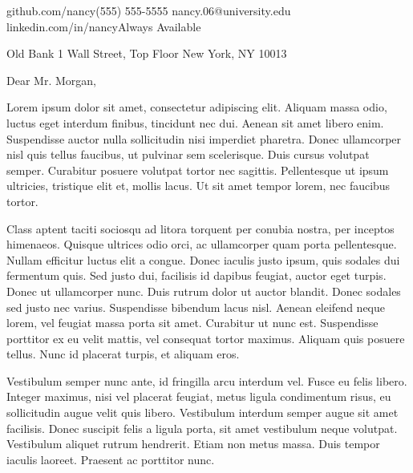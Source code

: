 \documentclass{practical-cover-letter}
\begin{document}
\namehead

\address{nancy.com}{github.com/nancy}{(555) 555-5555}{ nancy.06@university.edu }{linkedin.com/in/nancy}{Always Available}
%
%
\hfill

\begin{changemargin}{.7in}{.7in} 
\employerdate{\today}

\begin{changemargin}{.3in}{.3in} 
{Old Bank}
{1 Wall Street, Top Floor}
{New York, NY 10013}
\end{changemargin}


Dear Mr. Morgan,

Lorem ipsum dolor sit amet, consectetur adipiscing elit. Aliquam massa odio, luctus eget interdum finibus, tincidunt nec dui. Aenean sit amet libero enim. Suspendisse auctor nulla sollicitudin nisi imperdiet pharetra. Donec ullamcorper nisl quis tellus faucibus, ut pulvinar sem scelerisque. Duis cursus volutpat semper. Curabitur posuere volutpat tortor nec sagittis. Pellentesque ut ipsum ultricies, tristique elit et, mollis lacus. Ut sit amet tempor lorem, nec faucibus tortor.

Class aptent taciti sociosqu ad litora torquent per conubia nostra, per inceptos himenaeos. Quisque ultrices odio orci, ac ullamcorper quam porta pellentesque. Nullam efficitur luctus elit a congue. Donec iaculis justo ipsum, quis sodales dui fermentum quis. Sed justo dui, facilisis id dapibus feugiat, auctor eget turpis. Donec ut ullamcorper nunc. Duis rutrum dolor ut auctor blandit. Donec sodales sed justo nec varius. Suspendisse bibendum lacus nisl. Aenean eleifend neque lorem, vel feugiat massa porta sit amet. Curabitur ut nunc est. Suspendisse porttitor ex eu velit mattis, vel consequat tortor maximus. Aliquam quis posuere tellus. Nunc id placerat turpis, et aliquam eros.

Vestibulum semper nunc ante, id fringilla arcu interdum vel. Fusce eu felis libero. Integer maximus, nisi vel placerat feugiat, metus ligula condimentum risus, eu sollicitudin augue velit quis libero. Vestibulum interdum semper augue sit amet facilisis. Donec suscipit felis a ligula porta, sit amet vestibulum neque volutpat. Vestibulum aliquet rutrum hendrerit. Etiam non metus massa. Duis tempor iaculis laoreet. Praesent ac porttitor nunc.


\end{changemargin}
\end{document}
